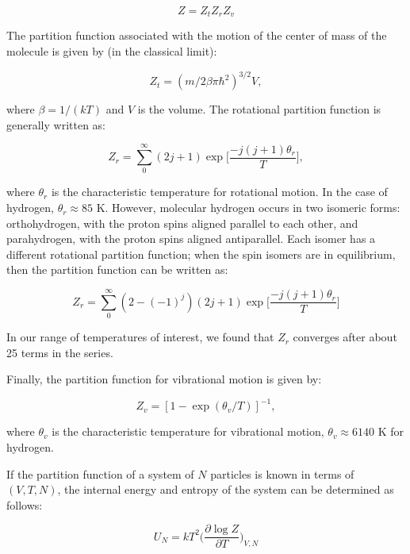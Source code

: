 \documentclass[apj]{emulateapj}
\begin{document}
\begin{equation}
\label{eq:zagain}
Z=Z_t Z_r Z_v
\end{equation} 

The partition function associated with the motion of the center of mass of the molecule is given by (in the classical limit):

\begin{equation}
\label{eq:Zt}
Z_t=(m/2 \beta \pi \hbar^2)^{3/2} V,
\end{equation}

\noindent where $\beta=1/(k T)$ and $V$ is the volume. The rotational partition function is generally written as:

\begin{equation}
\label{eq:Zr}
Z_r=\sum_0^\infty (2 j+1) \exp{\Big[\frac{-j (j+1)\theta_r}{T}\Big]},
\end{equation}

\noindent where $\theta_r$ is the characteristic temperature for rotational motion. In the case of hydrogen, $\theta_r \approx 85$ K. However, molecular hydrogen occurs in two isomeric forms: orthohydrogen, with the proton spins aligned parallel to each other, and parahydrogen, with the proton spins aligned antiparallel. Each isomer has a different rotational partition function; when the spin isomers are in equilibrium, then the partition function can be written as:

\begin{equation}
\label{eq:Zrspin}
Z_r=\sum_0^\infty (2-(-1)^j) (2j+1) \exp{\Big[\frac{-j (j+1) \theta_r}{T}\Big]}
\end{equation}

In our range of temperatures of interest, we found that $Z_r$ converges after about 25 terms in the series.


Finally, the partition function for vibrational motion is given by:

\begin{equation}
\label{eq:Zv}
Z_v=[1-\exp{(\theta_v/T)}]^{-1},
\end{equation}

\noindent where $\theta_v$ is the characteristic temperature for vibrational motion, $\theta_v \approx 6140$ K for hydrogen. 

If the partition function of a system of $N$ particles is known in terms of $(V, T, N)$, the internal energy and entropy of the system can be determined as follows:

\begin{equation}
\label{eq:U}
U_N=k T^2 \Big(\frac{\partial \log{Z}}{\partial T}\Big)_{V, N}
\end{equation}
\end{document}
